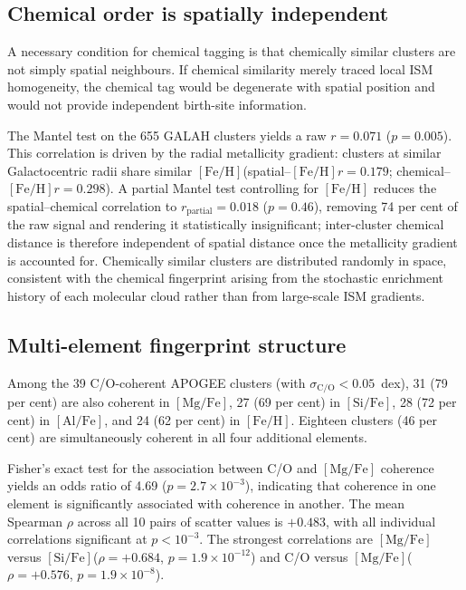 \documentclass[fleqn,usenatbib]{mnras}
\newcommand{\feh}{$\mathrm{[Fe/H]}$\xspace}
\newcommand{\mgfe}{$\mathrm{[Mg/Fe]}$\xspace}
\newcommand{\sife}{$\mathrm{[Si/Fe]}$\xspace}
\newcommand{\alfe}{$\mathrm{[Al/Fe]}$\xspace}
\newcommand{\co}{C/O\xspace}
\begin{document}
\subsection{Chemical order is spatially independent}
\label{sec:spatial}

A necessary condition for chemical tagging is that chemically similar clusters are not simply spatial neighbours.
If chemical similarity merely traced local ISM homogeneity, the chemical tag would be degenerate with spatial position and would not provide independent birth-site information.

The Mantel test on the 655 GALAH clusters yields a raw $r = 0.071$ ($p = 0.005$). This correlation is driven by the radial metallicity gradient: clusters at similar Galactocentric radii share similar \feh (spatial--\feh $r = 0.179$; chemical--\feh $r = 0.298$).
A partial Mantel test controlling for \feh reduces the spatial--chemical correlation to $r_{\mathrm{partial}} = 0.018$ ($p = 0.46$), removing 74 per cent of the raw signal and rendering it statistically insignificant; inter-cluster chemical distance is therefore independent of spatial distance once the metallicity gradient is accounted for.
Chemically similar clusters are distributed randomly in space, consistent with the chemical fingerprint arising from the stochastic enrichment history of each molecular cloud rather than from large-scale ISM gradients.

\subsection{Multi-element fingerprint structure}
\label{sec:multielement_results}

Among the 39 \co-coherent APOGEE clusters (with $\sigma_{\mathrm{C/O}} < 0.05$~dex), 31 (79 per cent) are also coherent in \mgfe, 27 (69 per cent) in \sife, 28 (72 per cent) in \alfe, and 24 (62 per cent) in \feh.
Eighteen clusters (46 per cent) are simultaneously coherent in all four additional elements.

Fisher's exact test for the association between \co and \mgfe coherence yields an odds ratio of 4.69 ($p = 2.7 \times 10^{-3}$), indicating that coherence in one element is significantly associated with coherence in another.
The mean Spearman $\rho$ across all 10 pairs of scatter values is $+0.483$, with all individual correlations significant at $p < 10^{-3}$.
The strongest correlations are \mgfe versus \sife ($\rho = +0.684$, $p = 1.9 \times 10^{-12}$) and \co versus \mgfe ($\rho = +0.576$, $p = 1.9 \times 10^{-8}$).
\end{document}
